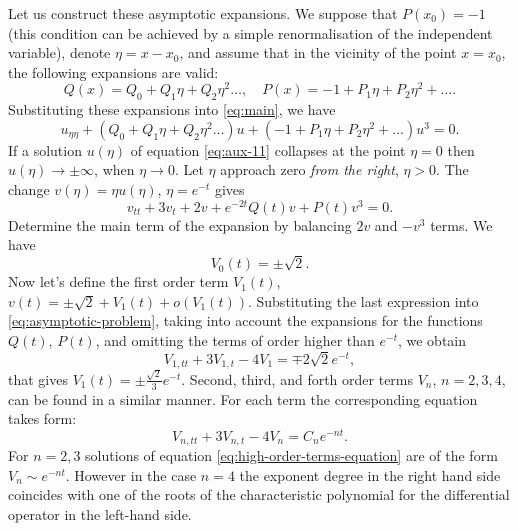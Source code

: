 Let us construct these asymptotic expansions.
We suppose that $P(x_0) = -1$ (this condition can be achieved by a simple renormalisation of the independent variable), denote $\eta = x - x_0$, and assume that in the vicinity of the point $x = x_0$, the following expansions are valid:
\begin{equation}
	Q(x) = Q_0 + Q_1 \eta + Q_2 \eta^2 \dots, \quad P(x) = -1 + P_1 \eta + P_2 \eta^2 + \dots.
\end{equation}
Substituting these expansions into \eqref{eq:main}, we have
\begin{equation}
	u_{\eta\eta} + (Q_0 + Q_1 \eta + Q_2 \eta^2 \dots)u + (-1 + P_1 \eta + P_2 \eta^2 + \dots) u^3 = 0.
	\label{eq:aux-11}
\end{equation}
If a solution $u(\eta)$ of equation \eqref{eq:aux-11} collapses at the point $\eta = 0$ then $u(\eta) \to \pm \infty$, when $\eta \to 0$.
Let $\eta$ approach zero {\it from the right}, $\eta > 0$.
The change $v(\eta) = \eta u(\eta)$, $\eta = e^{-t}$ gives
\begin{equation}
	v_{tt} + 3v_{t} + 2v + e^{-2t} Q(t) v + P(t) v^3 = 0.
	\label{eq:asymptotic-problem}
\end{equation}
Determine the main term of the expansion by balancing $2v$ and $-v^3$ terms.
We have
\begin{equation}
	V_0(t) = \pm \sqrt{2}.
	\label{eq:main-term}
\end{equation}
Now let's define the first order term $V_1(t)$, $v(t) = \pm \sqrt{2} + V_1(t) + o(V_1(t))$.
Substituting the last expression into \eqref{eq:asymptotic-problem}, taking into account the expansions for the functions $Q(t)$, $P(t)$, and omitting the terms of order higher than $e^{-t}$, we obtain
\begin{equation}
	V_{1, tt} + 3V_{1, t} - 4V_1 = \mp 2 \sqrt{2} e^{-t},
\end{equation}
that gives $V_1(t) = \pm \frac{\sqrt{2}}{3} e^{-t}$.
Second, third, and forth order terms $V_n$, $n = 2, 3, 4$, can be found in a similar manner.
For each term the corresponding equation takes form:
\begin{equation}
	V_{n, tt} + 3V_{n, t} - 4V_n = C_n e^{-nt}.
	\label{eq:high-order-terms-equation}
\end{equation}
For $n = 2, 3$ solutions of equation \eqref{eq:high-order-terms-equation} are of the form $V_n \sim e^{-nt}$.
However in the case $n = 4$ the exponent degree in the right hand side coincides with one of the roots of the characteristic polynomial for the differential operator in the left-hand side.
